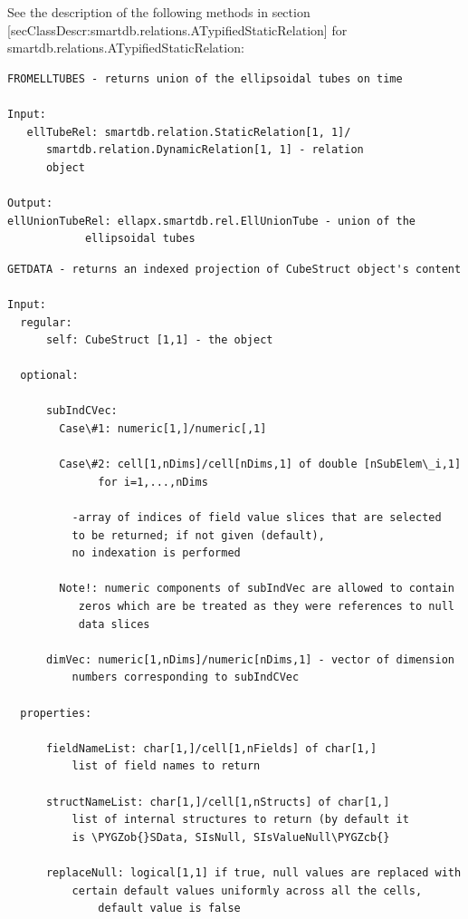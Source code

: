 \documentclass[letterpaper,10pt,english]{sphinxmanual}
\def\PYGZob{\char`\{}
\def\PYGZcb{\char`\}}
\begin{document}
See the description of the following methods in section
{[}secClassDescr:smartdb.relations.ATypifiedStaticRelation{]} for
smartdb.relations.ATypifiedStaticRelation:

\begin{Verbatim}[commandchars=\\\{\}]
FROMELLTUBES - returns union of the ellipsoidal tubes on time

Input:
   ellTubeRel: smartdb.relation.StaticRelation[1, 1]/
      smartdb.relation.DynamicRelation[1, 1] - relation
      object

Output:
ellUnionTubeRel: ellapx.smartdb.rel.EllUnionTube - union of the
            ellipsoidal tubes
\end{Verbatim}

\begin{Verbatim}[commandchars=\\\{\}]
GETDATA - returns an indexed projection of CubeStruct object's content

Input:
  regular:
      self: CubeStruct [1,1] - the object

  optional:

      subIndCVec:
        Case\#1: numeric[1,]/numeric[,1]

        Case\#2: cell[1,nDims]/cell[nDims,1] of double [nSubElem\_i,1]
              for i=1,...,nDims

          -array of indices of field value slices that are selected
          to be returned; if not given (default),
          no indexation is performed

        Note!: numeric components of subIndVec are allowed to contain
           zeros which are be treated as they were references to null
           data slices

      dimVec: numeric[1,nDims]/numeric[nDims,1] - vector of dimension
          numbers corresponding to subIndCVec

  properties:

      fieldNameList: char[1,]/cell[1,nFields] of char[1,]
          list of field names to return

      structNameList: char[1,]/cell[1,nStructs] of char[1,]
          list of internal structures to return (by default it
          is \PYGZob{}SData, SIsNull, SIsValueNull\PYGZcb{}

      replaceNull: logical[1,1] if true, null values are replaced with
          certain default values uniformly across all the cells,
              default value is false


\end{Verbatim}
\end{document}

